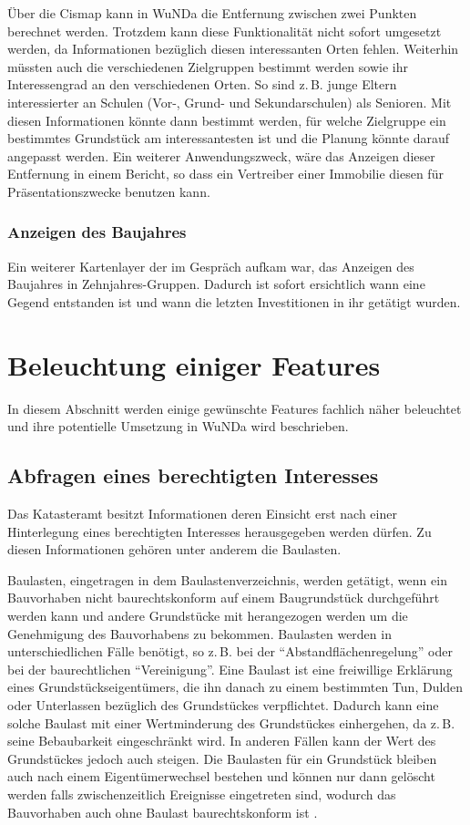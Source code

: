Über die Cismap kann in \ac{WuNDa} die Entfernung zwischen zwei Punkten berechnet werden.
Trotzdem kann diese Funktionalität nicht sofort umgesetzt werden, da Informationen bezüglich diesen interessanten Orten fehlen.
Weiterhin müssten auch die verschiedenen Zielgruppen bestimmt werden sowie ihr Interessengrad an den verschiedenen Orten.
So sind z.\,B. junge Eltern interessierter an Schulen (Vor-, Grund- und Sekundarschulen) als Senioren.
Mit diesen Informationen könnte dann bestimmt werden, für welche Zielgruppe ein bestimmtes Grundstück am interessantesten ist und die Planung könnte darauf angepasst werden.
Ein weiterer Anwendungszweck, wäre das Anzeigen dieser Entfernung in einem Bericht, so dass ein Vertreiber einer Immobilie diesen für Präsentationszwecke benutzen kann.

\subsubsection{Anzeigen des Baujahres}
Ein weiterer Kartenlayer der im Gespräch aufkam war, das Anzeigen des Baujahres in Zehnjahres-Gruppen.
Dadurch ist sofort ersichtlich wann eine Gegend entstanden ist und wann die letzten Investitionen in ihr getätigt wurden.

\section{Beleuchtung einiger Features}

In diesem Abschnitt werden einige gewünschte Features fachlich näher beleuchtet und ihre potentielle Umsetzung in \ac{WuNDa} wird beschrieben.

\subsection{Abfragen eines berechtigten Interesses}
\label{subsec:berechtigtes-interesse}
Das Katasteramt besitzt Informationen deren Einsicht erst nach einer Hinterlegung eines berechtigten Interesses herausgegeben werden dürfen.
Zu diesen Informationen gehören unter anderem die Baulasten.

Baulasten, eingetragen in dem Baulastenverzeichnis, werden getätigt, wenn ein Bauvorhaben nicht baurechtskonform auf einem Baugrundstück durchgeführt werden kann und andere Grundstücke mit herangezogen werden um die Genehmigung des Bauvorhabens zu bekommen.
Baulasten werden in unterschiedlichen Fälle benötigt, so z.\,B. bei der \enquote{Abstandflächenregelung} oder bei der baurechtlichen \enquote{Vereinigung}.
Eine Baulast ist eine freiwillige Erklärung eines Grundstückseigentümers, die ihn danach zu einem bestimmten Tun, Dulden oder Unterlassen bezüglich des Grundstückes verpflichtet.
Dadurch kann eine solche Baulast mit einer Wertminderung des Grundstückes einhergehen, da z.\,B. seine Bebaubarkeit eingeschränkt wird.
In anderen Fällen kann der Wert des Grundstückes jedoch auch steigen.
Die Baulasten für ein Grundstück bleiben auch nach einem Eigentümerwechsel bestehen und können nur dann gelöscht werden falls zwischenzeitlich Ereignisse eingetreten sind, wodurch das Bauvorhaben auch ohne Baulast baurechtskonform ist \autocite[vgl.][]{herne-baulasten}.

